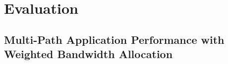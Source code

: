 \section{Evaluation}


\subsection{Multi-Path Application Performance with Weighted Bandwidth Allocation}

